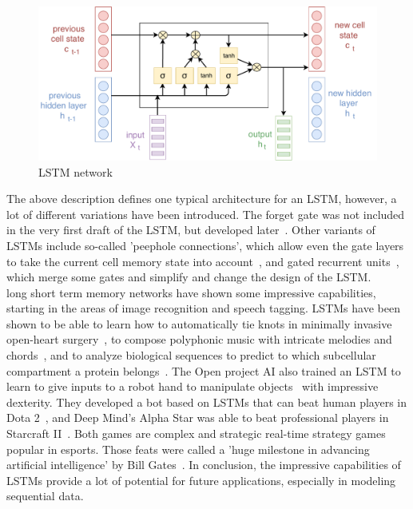 \documentclass[
a4paper,
pagesize,
pdftex,
12pt,
twoside, %
BCOR=5mm, %
ngerman,
fleqn,
final,
]{scrartcl}
\begin{document}
	\begin{figure}[ht]
		\centering
		\includegraphics[width=\linewidth]{img/LSTM}
		\caption{LSTM network}
		\label{fig:architectureLSTM}
	\end{figure}
	
	The above description defines one typical architecture for an LSTM, however, a lot of different variations have been introduced. The forget gate was not included in the very first draft of the LSTM, but developed later~\cite{Gers.1999}. Other variants of LSTMs include so-called 'peephole connections', which allow even the gate layers to take the current cell memory state into account~\cite{Gers.2000}, and gated recurrent units~\cite{Cho.2014}, which merge some gates and simplify and change the design of the LSTM. \\
	long short term memory networks have shown some impressive capabilities, starting in the areas of image recognition and speech tagging. LSTMs have been shown to be able to learn how to automatically tie knots in minimally invasive open-heart surgery~\cite{Mayer.2008}, to compose polyphonic music with intricate melodies and chords~\cite{Kumar.2019}, and to analyze biological sequences to predict to which subcellular compartment a protein belongs~\cite{Snderby.2015}. The Open project AI also trained an LSTM to learn to give inputs to a robot hand to manipulate objects~\cite{OpenAIBlog.2018} with impressive dexterity. They developed a bot based on LSTMs that can beat human players in Dota 2~\cite{Rodriguez.2018}, and Deep Mind's Alpha Star was able to beat professional players in Starcraft II~\cite{Stanford.2019}. Both games are complex and strategic real-time strategy games popular in esports. Those feats were called a 'huge milestone in advancing artificial intelligence' by Bill Gates~\cite{Gates2019}. In conclusion, the impressive capabilities of LSTMs provide a lot of potential for future applications, especially in modeling sequential data.
	
\end{document}
